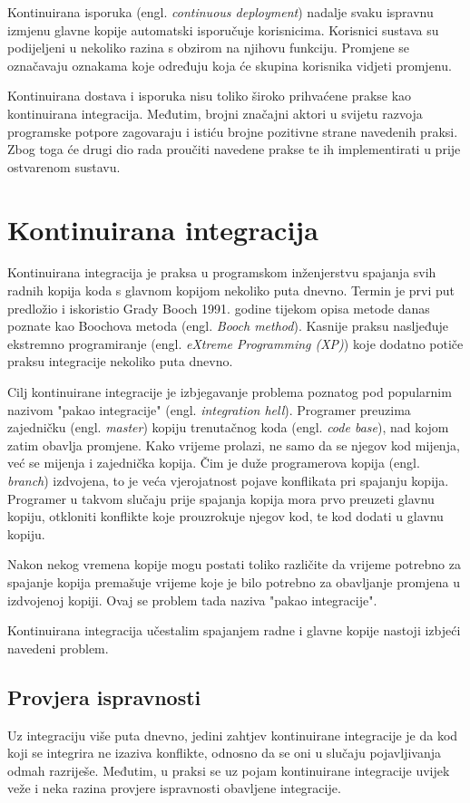 \documentclass[times, utf8, seminar, numeric]{fer}
\newcommand{\eng}[1]{(engl. \textit{#1})}
\begin{document}
Kontinuirana isporuka \eng{continuous deployment} nadalje svaku ispravnu izmjenu glavne kopije automatski isporučuje korisnicima. Korisnici sustava su podijeljeni u nekoliko razina s obzirom na njihovu funkciju. Promjene se označavaju oznakama koje određuju koja će skupina korisnika vidjeti promjenu\citep{aa:CDep}.

Kontinuirana dostava i isporuka nisu toliko široko prihvaćene prakse kao kontinuirana integracija. Međutim, brojni značajni aktori u svijetu razvoja programske potpore zagovaraju i istiću brojne pozitivne strane navedenih praksi. Zbog toga će drugi dio rada proučiti navedene prakse te ih implementirati u prije ostvarenom sustavu.

\chapter{Kontinuirana integracija}
Kontinuirana integracija je praksa u programskom inženjerstvu spajanja svih radnih kopija koda s glavnom kopijom nekoliko puta dnevno. Termin je prvi put predložio i iskoristio Grady Booch 1991. godine tijekom opisa metode danas poznate kao Boochova metoda \eng{Booch method}\citep{wiki:BoochMethod}. Kasnije praksu nasljeđuje ekstremno programiranje \eng{eXtreme Programming (XP)} koje dodatno potiče praksu integracije nekoliko puta dnevno.

Cilj kontinuirane integracije je izbjegavanje problema poznatog pod popularnim nazivom "pakao integracije" \eng{integration hell}. Programer preuzima zajedničku \eng{master} kopiju trenutačnog koda \eng{code base}, nad kojom zatim obavlja promjene. Kako vrijeme prolazi, ne samo da se njegov kod mijenja, već se mijenja i zajednička kopija. Čim je duže programerova kopija \eng{branch} izdvojena, to je veća vjerojatnost pojave konflikata pri spajanju kopija. Programer u takvom slučaju prije spajanja kopija mora prvo preuzeti glavnu kopiju, otkloniti konflikte koje prouzrokuje njegov kod, te kod dodati u glavnu kopiju.

Nakon nekog vremena kopije mogu postati toliko različite da vrijeme potrebno za spajanje kopija premašuje vrijeme koje je bilo potrebno za obavljanje promjena u izdvojenoj kopiji. Ovaj se problem tada naziva "pakao integracije". 

Kontinuirana integracija učestalim spajanjem radne i glavne kopije nastoji izbjeći navedeni problem.

\section{Provjera ispravnosti}
Uz integraciju više puta dnevno, jedini zahtjev kontinuirane integracije je da kod koji se integrira ne izaziva konflikte, odnosno da se oni u slučaju pojavljivanja odmah razriješe. Međutim, u praksi se uz pojam kontinuirane integracije uvijek veže i neka razina provjere ispravnosti obavljene integracije.
\end{document}
